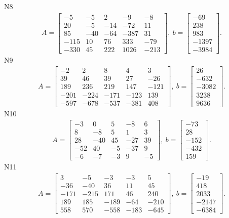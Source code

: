 \documentclass[11pt]{report}
\begin{document}
N8
\begin{align*}
 A = \left[\begin{matrix}-5 & -5 & 2 & -9 & -8\\20 & -5 & -14 & -72 & 11\\85 & -40 & -64 & -387 & 31\\-115 & 10 & 76 & 333 & -79\\-330 & 45 & 222 & 1026 & -213\end{matrix}\right],
\ b = \left[\begin{matrix}-69\\238\\983\\-1397\\-3984\end{matrix}\right]. 
 \end{align*}
N9
\begin{align*}
 A = \left[\begin{matrix}-2 & 2 & 8 & 4 & 3\\39 & 46 & 39 & 27 & -26\\189 & 236 & 219 & 147 & -121\\-201 & -224 & -171 & -123 & 139\\-597 & -678 & -537 & -381 & 408\end{matrix}\right],
\ b = \left[\begin{matrix}26\\-632\\-3082\\3238\\9636\end{matrix}\right]. 
 \end{align*}
N10
\begin{align*}
 A = \left[\begin{matrix}-3 & 0 & 5 & -8 & 6\\8 & -8 & 5 & 1 & 3\\28 & -40 & 45 & -27 & 39\\-52 & 40 & -5 & -37 & 9\\-6 & -7 & -3 & 9 & -5\end{matrix}\right],
\ b = \left[\begin{matrix}-73\\28\\-152\\-432\\159\end{matrix}\right]. 
 \end{align*}
N11
\begin{align*}
 A = \left[\begin{matrix}3 & -5 & -3 & -3 & 5\\-36 & -40 & 36 & 11 & 45\\-171 & -215 & 171 & 46 & 240\\189 & 185 & -189 & -64 & -210\\558 & 570 & -558 & -183 & -645\end{matrix}\right],
\ b = \left[\begin{matrix}-19\\418\\2033\\-2147\\-6384\end{matrix}\right]. 
 \end{align*}
\end{document}
